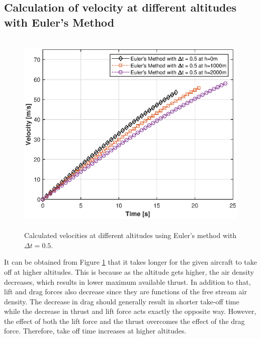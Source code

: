 \documentclass[letterpaper,12pt]{article}
\begin{document}
\subsection{Calculation of velocity at different altitudes with Euler's Method }
\begin{figure}[ht]
        \centering \includegraphics[max height=10cm]{graphs/altitude.eps}
        \caption{Calculated velocities at different altitudes using Euler's method with $\Delta t = 0.5$.}
        \label{fig:altitude}
\end{figure}

It can be obtained from Figure \ref{fig:altitude} that it takes longer for the given aircraft to take off at higher altitudes. 
This is because as the altitude gets higher, the air density decreases, which results in lower maximum available
thrust. In addition to that, lift and drag forces also decrease since they are functions of the free stream
air density. The decrease in drag should generally result in shorter take-off time while the decrease in thrust and lift
 force acts exactly the opposite way. However, the effect of both the lift force and the thrust overcomes 
 the effect of the drag force. Therefore, take off time increases at higher altitudes.
\newpage
\end{document}
